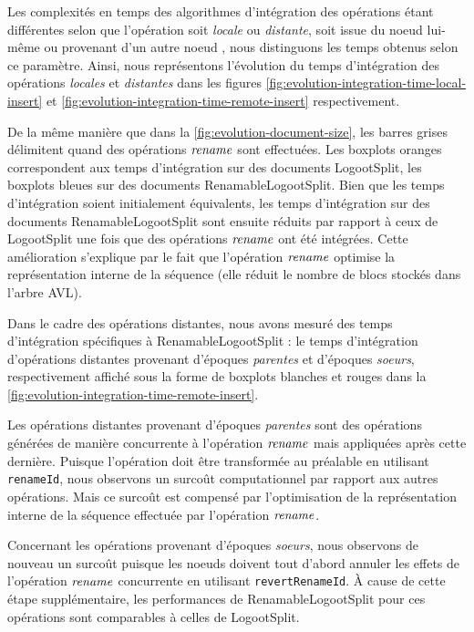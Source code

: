 Les complexités en temps des algorithmes d'intégration des opérations étant différentes selon que l'opération soit \emph{locale} ou \emph{distante}, \ie soit issue du noeud lui-même ou provenant d'un autre noeud , nous distinguons les temps obtenus selon ce paramètre.
Ainsi, nous représentons l'évolution du temps d'intégration des opérations \emph{locales} et \emph{distantes} dans les figures \ref{fig:evolution-integration-time-local-insert} et \ref{fig:evolution-integration-time-remote-insert} respectivement.

De la même manière que dans la \autoref{fig:evolution-document-size}, les barres grises délimitent quand des opérations $\mathit{rename}$ sont effectuées.
Les boxplots oranges correspondent aux temps d'intégration sur des documents LogootSplit, les boxplots bleues sur des documents RenamableLogootSplit.
Bien que les temps d'intégration soient initialement équivalents, les temps d'intégration sur des documents RenamableLogootSplit sont ensuite réduits par rapport à ceux de LogootSplit une fois que des opérations $\mathit{rename}$ ont été intégrées.
Cette amélioration s'explique par le fait que l'opération $\mathit{rename}$ optimise la représentation interne de la séquence (\ie elle réduit le nombre de blocs stockés dans l'arbre AVL).

Dans le cadre des opérations distantes, nous avons mesuré des temps d'intégration spécifiques à RenamableLogootSplit : le temps d'intégration d'opérations distantes provenant d'époques \emph{parentes} et d'époques \emph{soeurs}, respectivement affiché sous la forme de boxplots blanches et rouges dans la \autoref{fig:evolution-integration-time-remote-insert}.

Les opérations distantes provenant d'époques \emph{parentes} sont des opérations générées de manière concurrente à l'opération $\mathit{rename}$ mais appliquées après cette dernière.
Puisque l'opération doit être transformée au préalable en utilisant \texttt{renameId}, nous observons un surcoût computationnel par rapport aux autres opérations.
Mais ce surcoût est compensé par l'optimisation de la représentation interne de la séquence effectuée par l'opération $\mathit{rename}$.

Concernant les opérations provenant d'époques \emph{soeurs}, nous observons de nouveau un surcoût puisque les noeuds doivent tout d'abord annuler les effets de l'opération $\mathit{rename}$ concurrente en utilisant \texttt{revertRenameId}.
À cause de cette étape supplémentaire, les performances de RenamableLogootSplit pour ces opérations sont comparables à celles de LogootSplit.

